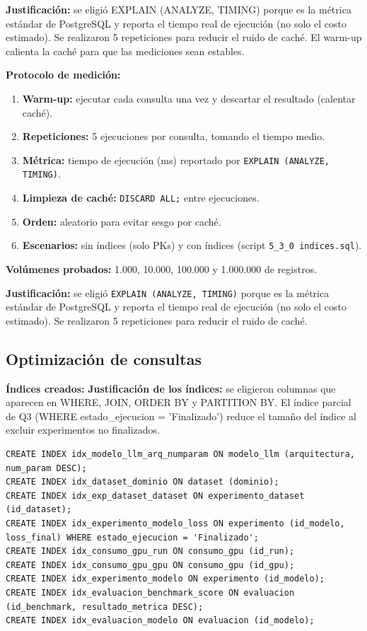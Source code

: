 \documentclass[12pt,a4paper]{article}
\begin{document}
\textbf{Justificación:} se eligió EXPLAIN (ANALYZE, TIMING) porque es la métrica estándar de PostgreSQL y reporta el tiempo real de ejecución (no solo el costo estimado). Se realizaron 5 repeticiones para reducir el ruido de caché. El warm-up calienta la caché para que las mediciones sean estables.

\textbf{Protocolo de medición:}
\begin{enumerate}
  \item \textbf{Warm-up:} ejecutar cada consulta una vez y descartar el resultado (calentar caché).
  \item \textbf{Repeticiones:} 5 ejecuciones por consulta, tomando el tiempo medio.
  \item \textbf{Métrica:} tiempo de ejecución (ms) reportado por \texttt{EXPLAIN (ANALYZE, TIMING)}.
  \item \textbf{Limpieza de caché:} \texttt{DISCARD ALL;} entre ejecuciones.
  \item \textbf{Orden:} aleatorio para evitar sesgo por caché.
  \item \textbf{Escenarios:} sin índices (solo PKs) y con índices (script \texttt{5\_3\_0 indices.sql}).
\end{enumerate}

\textbf{Volúmenes probados:} 1.000, 10.000, 100.000 y 1.000.000 de registros.

\textbf{Justificación:} se eligió \texttt{EXPLAIN (ANALYZE, TIMING)} porque es la métrica estándar de PostgreSQL y reporta el tiempo real de ejecución (no solo el costo estimado). Se realizaron 5 repeticiones para reducir el ruido de caché.

\subsection{Optimización de consultas}

\textbf{Índices creados:}
\textbf{Justificación de los índices:} se eligieron columnas que aparecen en WHERE, JOIN, ORDER BY y PARTITION BY. El índice parcial de Q3 (WHERE estado_ejecucion = 'Finalizado') reduce el tamaño del índice al excluir experimentos no finalizados.


\begin{lstlisting}
CREATE INDEX idx_modelo_llm_arq_numparam ON modelo_llm (arquitectura, num_param DESC);
CREATE INDEX idx_dataset_dominio ON dataset (dominio);
CREATE INDEX idx_exp_dataset_dataset ON experimento_dataset (id_dataset);
CREATE INDEX idx_experimento_modelo_loss ON experimento (id_modelo, loss_final) WHERE estado_ejecucion = 'Finalizado';
CREATE INDEX idx_consumo_gpu_run ON consumo_gpu (id_run);
CREATE INDEX idx_consumo_gpu_gpu ON consumo_gpu (id_gpu);
CREATE INDEX idx_experimento_modelo ON experimento (id_modelo);
CREATE INDEX idx_evaluacion_benchmark_score ON evaluacion (id_benchmark, resultado_metrica DESC);
CREATE INDEX idx_evaluacion_modelo ON evaluacion (id_modelo);
\end{lstlisting}
\end{document}
